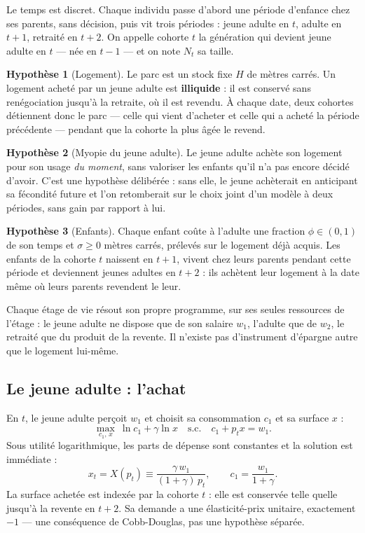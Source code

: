 \documentclass[11pt,a4paper]{article}
\theoremstyle{plain}
\theoremstyle{definition}
\newtheorem{hypothese}{Hypothèse}
\begin{document}
Le temps est discret. Chaque individu passe d'abord une période d'enfance chez ses parents, sans décision, puis vit trois périodes : jeune adulte en $t$, adulte en $t+1$, retraité en $t+2$. On appelle cohorte $t$ la génération qui devient jeune adulte en $t$ — née en $t-1$ — et on note $N_t$ sa taille.

\begin{hypothese}[Logement]
Le parc est un stock fixe $H$ de mètres carrés. Un logement acheté par un jeune adulte est \textbf{illiquide} : il est conservé sans renégociation jusqu'à la retraite, où il est revendu. À chaque date, deux cohortes détiennent donc le parc — celle qui vient d'acheter et celle qui a acheté la période précédente — pendant que la cohorte la plus âgée le revend.
\end{hypothese}

\begin{hypothese}[Myopie du jeune adulte]\label{hyp:myopie}
Le jeune adulte achète son logement pour son usage \emph{du moment}, sans valoriser les enfants qu'il n'a pas encore décidé d'avoir. C'est une hypothèse délibérée : sans elle, le jeune achèterait en anticipant sa fécondité future et l'on retomberait sur le choix joint d'un modèle à deux périodes, sans gain par rapport à lui.
\end{hypothese}

\begin{hypothese}[Enfants]
Chaque enfant coûte à l'adulte une fraction $\phi \in (0,1)$ de son temps et $\sigma \geq 0$ mètres carrés, prélevés sur le logement déjà acquis. Les enfants de la cohorte $t$ naissent en $t+1$, vivent chez leurs parents pendant cette période et deviennent jeunes adultes en $t+2$ : ils achètent leur logement à la date même où leurs parents revendent le leur.
\end{hypothese}

Chaque étage de vie résout son propre programme, sur ses seules ressources de l'étage : le jeune adulte ne dispose que de son salaire $w_1$, l'adulte que de $w_2$, le retraité que du produit de la revente. Il n'existe pas d'instrument d'épargne autre que le logement lui-même.

\subsection{Le jeune adulte : l'achat}

En $t$, le jeune adulte perçoit $w_1$ et choisit sa consommation $c_1$ et sa surface $x$ :
\begin{equation}\label{eq:P1}
\max_{c_1,\,x} \ \ln c_1 + \gamma \ln x \quad \text{s.c.} \quad c_1 + p_t x = w_1 .
\end{equation}
Sous utilité logarithmique, les parts de dépense sont constantes et la solution est immédiate :
\begin{equation}\label{eq:x}
x_t = X(p_t) \equiv \frac{\gamma\, w_1}{(1+\gamma)\, p_t} , \qquad c_1 = \frac{w_1}{1+\gamma} .
\end{equation}
La surface achetée est indexée par la cohorte $t$ : elle est conservée telle quelle jusqu'à la revente en $t+2$. Sa demande a une élasticité-prix unitaire, exactement $-1$ — une conséquence de Cobb-Douglas, pas une hypothèse séparée.
\end{document}
